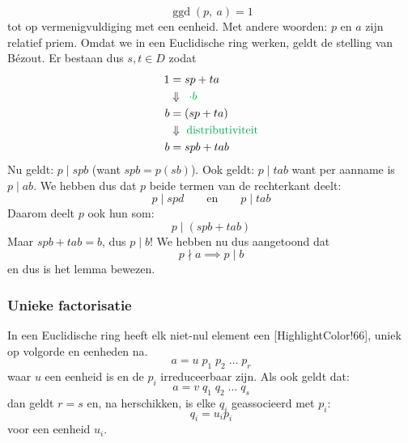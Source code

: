 \begin{equation*}
    \operatorname{ggd}(p,\ a) = 1
\end{equation*}
tot op vermenigvuldiging met een eenheid. Met andere woorden: $p$ en $a$ zijn relatief priem. Omdat we in een Euclidische ring werken, geldt de stelling van Bézout. Er bestaan dus $s,t\in D$ zodat
\begin{equation*}
    \begin{aligned}
        1 &= sp + ta \\
          &\Downarrow \textcolor{Green}{\;\; \cdot b} \\
        b &= (sp + ta) \\
          &\Downarrow \textcolor{Green}{\text{ distributiviteit}} \\
        b &= spb + tab  
    \end{aligned}
\end{equation*}
Nu geldt: $p \mid spb$ (want $spb = p(sb)$). Ook geldt: $p \mid tab$ want per aanname is $p \mid ab$.
We hebben dus dat $p$ beide termen van de rechterkant deelt:
\begin{equation*}
    p \mid spd \qquad \text{en} \qquad p \mid tab
\end{equation*}
Daarom deelt $p$ ook hun som:
\begin{equation*}
    p \mid (spb + tab)
\end{equation*}
Maar $spb + tab = b$, dus $p \mid b$! We hebben nu dus aangetoond dat
\begin{equation*}
    p \nmid a \implies p \mid b
\end{equation*}
en dus is het lemma bewezen.

\subsubsection{Unieke factorisatie}

In een Euclidische ring heeft elk niet-nul element een [HighlightColor!66], uniek op volgorde en eenheden na.
\begin{equation*}
    a = u\;p_1\;p_2\;\dots\;p_r
\end{equation*}
waar $u$ een eenheid is en de $p_i$ irreduceerbaar zijn. Als ook geldt dat:
\begin{equation*}
    a = v\;q_1\;q_2\;\dots\;q_s
\end{equation*}
dan geldt $r=s$ en, na herschikken, is elke $q_i$ geassocieerd met $p_i$:
\begin{equation*}
    q_i = u_i p_i
\end{equation*}
voor een eenheid $u_i$.

